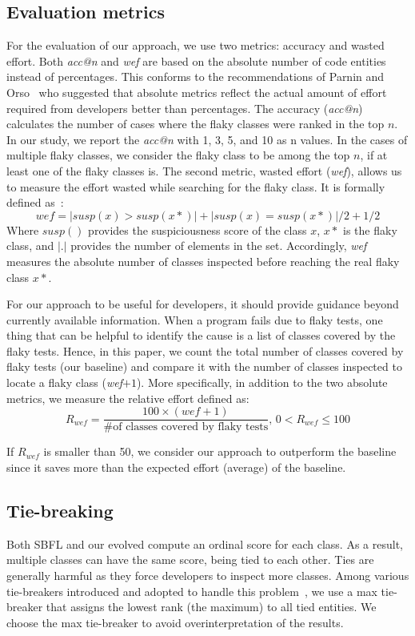 \subsection{Evaluation metrics}
For the evaluation of our approach, we use two metrics: accuracy and wasted effort. 
Both \textit{acc@n} and \textit{wef} are based on the absolute number of code entities instead of percentages.
This conforms to the recommendations of Parnin and Orso~\cite{parnin} who suggested that absolute metrics reflect the actual amount of effort required from developers better than percentages. 
The accuracy (\textit{acc@n}) calculates the number of cases where the flaky classes were ranked in the top $n$.
In our study, we report the \textit{acc@n} with 1, 3, 5, and 10 as n values. %
In the cases of multiple flaky classes, we consider the flaky class to be among the top $n$, if at least one of the flaky classes is.
The second metric, wasted effort (\textit{wef}), allows us to measure the effort wasted while searching for the flaky class. It is formally defined as~\cite{Xuan2014}:
\[ wef = |{susp(x) > susp(x*)}| + |{susp(x) = susp(x*)}|/2 + 1/2\]
Where $susp()$ provides the suspiciousness score of the class $x$, $x*$ is the flaky class, and $|.|$ provides the number of elements in the set. Accordingly, \textit{wef} measures the absolute number of classes inspected before reaching the real flaky class $x*$. 

For our approach to be useful for developers, it should provide guidance beyond currently available information. 
When a program fails due to flaky tests, one thing that can be helpful to identify the cause is a list of classes covered by the flaky tests.
Hence, in this paper, we count the total number of classes covered by flaky tests (\ie our baseline) and compare it with the number of classes inspected to locate a flaky class (\ie \textit{wef}$+1$). 
More specifically, in addition to the two absolute metrics, we measure the relative effort defined as:
\[R_{wef} = \frac{100 \times (wef + 1)}{\text{\# of classes covered by flaky tests}}\text{, } 0 < R_{wef} \leq 100\]

If $R_{wef}$ is smaller than 50, we consider our approach to outperform the baseline since it saves more than the expected effort (\ie average) of the baseline.

\subsection{Tie-breaking}
\label{Tie-breaking}
Both SBFL and our evolved \formulas compute an ordinal score for each class. As a result, multiple classes can have the same score, being tied to each other. Ties are generally harmful as they force developers to inspect more classes. Among various tie-breakers introduced and adopted to handle this problem~\cite{xu2011ties}, we use a max tie-breaker that assigns the lowest rank (\ie the maximum) to all tied entities. We choose the max tie-breaker to avoid overinterpretation of the results. 